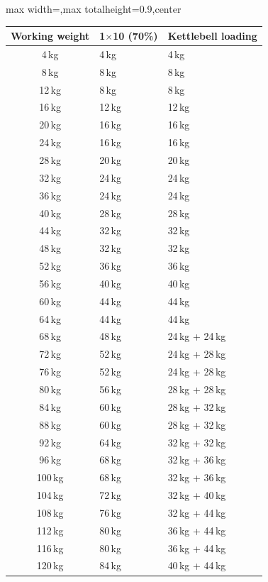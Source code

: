 \documentclass[11pt,a4paper]{article}
\newcommand{\tablearraystretch}{1.15}
\begin{document}
\begin{center}
\renewcommand{\arraystretch}{\tablearraystretch}
\begin{adjustbox}{max width=\linewidth,max totalheight=0.9\textheight,center}
\begin{tabular}{cll}
\toprule
Working weight & 1$\times$10 (70\%) & Kettlebell loading \\
\midrule
4\,kg   & 4\,kg   & 4\,kg \\
8\,kg   & 8\,kg   & 8\,kg \\
12\,kg  & 8\,kg   & 8\,kg \\
16\,kg  & 12\,kg  & 12\,kg \\
20\,kg  & 16\,kg  & 16\,kg \\
24\,kg  & 16\,kg  & 16\,kg \\
28\,kg  & 20\,kg  & 20\,kg \\
32\,kg  & 24\,kg  & 24\,kg \\
36\,kg  & 24\,kg  & 24\,kg \\
40\,kg  & 28\,kg  & 28\,kg \\
44\,kg  & 32\,kg  & 32\,kg \\
48\,kg  & 32\,kg  & 32\,kg \\
52\,kg  & 36\,kg  & 36\,kg \\
56\,kg  & 40\,kg  & 40\,kg \\
60\,kg  & 44\,kg  & 44\,kg \\
64\,kg  & 44\,kg  & 44\,kg \\
68\,kg  & 48\,kg  & 24\,kg + 24\,kg \\
72\,kg  & 52\,kg  & 24\,kg + 28\,kg \\
76\,kg  & 52\,kg  & 24\,kg + 28\,kg \\
80\,kg  & 56\,kg  & 28\,kg + 28\,kg \\
84\,kg  & 60\,kg  & 28\,kg + 32\,kg \\
88\,kg  & 60\,kg  & 28\,kg + 32\,kg \\
92\,kg  & 64\,kg  & 32\,kg + 32\,kg \\
96\,kg  & 68\,kg  & 32\,kg + 36\,kg \\
100\,kg & 68\,kg  & 32\,kg + 36\,kg \\
104\,kg & 72\,kg  & 32\,kg + 40\,kg \\
108\,kg & 76\,kg  & 32\,kg + 44\,kg \\
112\,kg & 80\,kg  & 36\,kg + 44\,kg \\
116\,kg & 80\,kg  & 36\,kg + 44\,kg \\
120\,kg & 84\,kg  & 40\,kg + 44\,kg \\
\bottomrule
\end{tabular}
\end{adjustbox}
\renewcommand{\arraystretch}{1}
\end{center}
\end{document}
